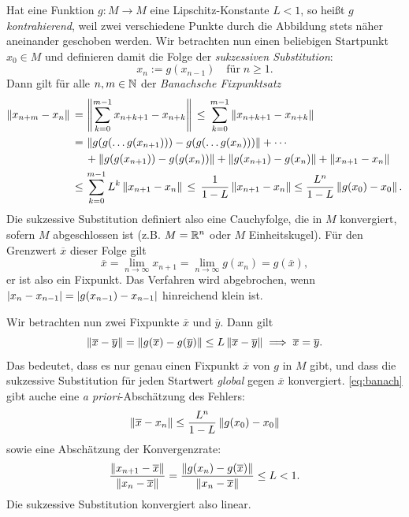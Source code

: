  Hat eine Funktion $g:M\to M$ eine
Lipschitz-Konstante $L<1$, so heißt $g$ \emph{kontrahierend}, weil
zwei verschiedene Punkte durch die Abbildung stets näher aneinander
geschoben werden. Wir betrachten nun einen beliebigen Startpunkt
$x_0\in M$ und definieren damit die Folge der \emph{sukzessiven Substitution}:
\begin{equation}
  x_{n} := g(x_{n-1}) \quad\text{für}\; n\ge 1.
\end{equation}
Dann gilt für alle $n,m\in\mathbb{N}$ der \emph{Banachsche Fixpunktsatz}
\begin{align}
  \label{eq:banach}
  \left\lVert{x_{n+m} - x_n}\right\rVert \,=\, &\left\lVert{\sum_{k=0}^{m-1} x_{n+k+1} - x_{n+k}}\right\rVert
  \,\le\, \sum_{k=0}^{m-1} \left\lVert{x_{n+k+1} - x_{n+k}}\right\rVert\nonumber\\
  \,=\, &\left\lVert{g(g(\ldots g(x_{n+1}))) - g(g(\ldots g(x_{n})))}\right\rVert
  + \cdots\nonumber\\
  &+ \left\lVert{g(g(x_{n+1})) - g(g(x_{n}))}\right\rVert
  + \left\lVert{g(x_{n+1}) - g(x_{n})}\right\rVert + \left\lVert{x_{n+1} - x_{n}}\right\rVert\nonumber\\
  \le\, &\sum_{k=0}^{m-1} L^k \left\lVert{x_{n+1} - x_{n}}\right\rVert
  \,\le\, \frac{1}{1-L}\left\lVert{x_{n+1} - x_{n}}\right\rVert \le
  \frac{L^n}{1-L}\left\lVert{g(x_0) - x_0}\right\rVert.
\end{align}
Die sukzessive Substitution definiert also eine Cauchyfolge, die in
$M$ konvergiert, sofern $M$ abgeschlossen ist (z.B. $M=\mathbb{R}^n$ oder $M$
Einheitskugel). Für den Grenzwert $\overline{x}$ dieser Folge gilt
\begin{equation}
  \overline{x} = \lim_{n\to\infty}x_{n+1} = \lim_{n\to\infty}g(x_{n})
  = g(\overline{x}),
\end{equation}
er ist also ein Fixpunkt. Das Verfahren wird abgebrochen, wenn
$\left\lvert{x_n - x_{n-1}}\right\rvert = \left\lvert{g(x_{n-1}) - x_{n-1}}\right\rvert$ hinreichend klein
ist.

Wir betrachten nun zwei Fixpunkte $\overline{x}$ und $\overline{y}$. Dann gilt
\begin{equation}
  \left\lVert{\overline{x} - \overline{y}}\right\rVert = \left\lVert{g(\overline{x}) -
    g(\overline{y})}\right\rVert \le L \left\lVert{\overline{x} - \overline{y}}\right\rVert \implies
  \overline{x} = \overline{y}.
\end{equation}
Das bedeutet, dass es nur genau einen Fixpunkt $\overline{x}$ von $g$
in $M$ gibt, und dass die sukzessive Substitution für jeden Startwert
\emph{global} gegen $\overline{x}$ konvergiert. \eqref{eq:banach}
gibt auche eine \textit{a priori}-Abschätzung des Fehlers:
\begin{equation}
  \left\lVert{\overline{x} - x_n}\right\rVert \le \frac{L^n}{1-L}\left\lVert{g(x_0) - x_0}\right\rVert
\end{equation}
sowie eine Abschätzung der Konvergenzrate:
\begin{equation}
  \frac{\left\lVert{x_{n+1} - \overline{x}}\right\rVert}{\left\lVert{x_n - \overline{x}}\right\rVert}
  = \frac{\left\lVert{g(x_n) - g(\overline{x})}\right\rVert}{\left\lVert{x_n - \overline{x}}\right\rVert}
  \le L < 1.
\end{equation}
Die sukzessive Substitution konvergiert also linear.

